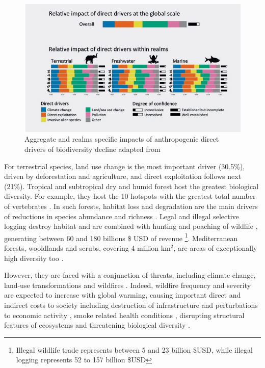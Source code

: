 \begin{figure}
	\centering
	\includegraphics[width = .95 \textwidth]{figures/intro/intro_impactsfin.jpg}
	\caption{Aggregate and realms specific impacts of anthropogenic direct drivers of biodiversity decline adapted from \citep{ipbes_2022_6417333}}
\end{figure}
For terrestrial species, land use change is the most important driver (30.5\%), driven by deforestation and agriculture, and direct exploitation follows next (21\%). Tropical and subtropical dry and humid forest host the greatest biological diversity. For example, they host the 10 hotspots with the greatest total number of vertebrates \citep{mittermeier_global_2011}. In such forests, habitat loss and degradation are the main drivers of reductions in species abundance and richness \citep{newbold_global_2014}. Legal and illegal selective logging destroy habitat \citep{hoare2022establishing,  bousfield_2023_large} and are combined with hunting and poaching of wildlife \citep{gallego_2020_combined}, generating between 60 and 180 billions  \$ USD of revenue \citep{gfi_2017}\footnote{Illegal wildlife trade represents between 5 and 23 billion \$USD, while illegal logging represents 52 to 157 billion \$USD}. Mediterranean forests, wooldlands and scrubs, covering 4 million km$^2$, are areas of exceptionally high diversity too \citep{Mooney2001, blondel_2010}. 

However, they are faced with a conjunction of threats, including climate change, land-use transformations \citep{newbold_tropical_2020} and wildfires \citep{Dupuy2019ClimateCI}. Indeed, wildfire frequency and severity are expected to increase with global warming, causing important direct and indirect costs to society including destruction of infrastructure and perturbations to economic activity \citep{wang_economic_2021}, smoke related health conditions \citep{burke_wildfire_2023, heft-neal_behavior_2023}, disrupting structural features of ecosystems \citep{Ayars2023} and threatening biological diversity \citep{Wintle2020}.

